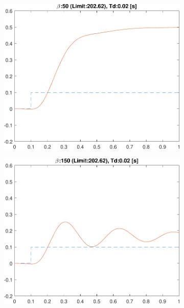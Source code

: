 \begin{figure}
	\begin{subfigure}{0.33\linewidth}
	\centering
\includegraphics[width=0.95\linewidth]{../code/stretch/figs/result_gain_50_Td_0.02}
\caption{}
	\end{subfigure}\hfill
	\begin{subfigure}{0.33\linewidth}
	\centering
	\includegraphics[width=0.95\linewidth]{../code/stretch/figs/result_gain_150_Td_0.02}
	\caption{}
\end{subfigure}\hfill
	\begin{subfigure}{0.33\linewidth}
	\centering

\end{subfigure}
\end{figure}
